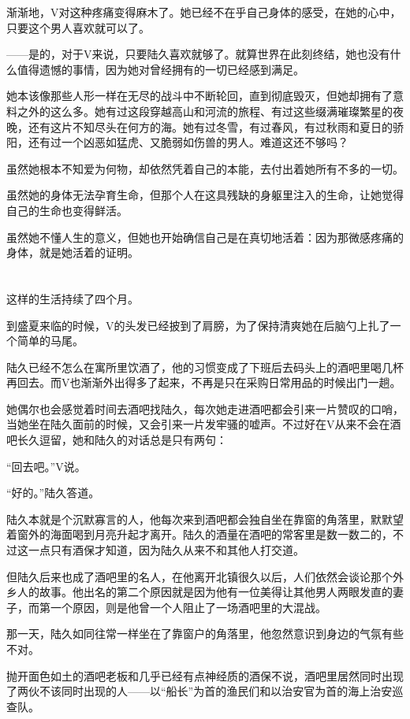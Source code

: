渐渐地，V对这种疼痛变得麻木了。她已经不在乎自己身体的感受，在她的心中，只要这个男人喜欢就可以了。

——是的，对于V来说，只要陆久喜欢就够了。就算世界在此刻终结，她也没有什么值得遗憾的事情，因为她对曾经拥有的一切已经感到满足。

她本该像那些人形一样在无尽的战斗中不断轮回，直到彻底毁灭，但她却拥有了意料之外的这么多。她有过这段穿越高山和河流的旅程、有过这些缀满璀璨繁星的夜晚，还有这片不知尽头在何方的海。她有过冬雪，有过春风，有过秋雨和夏日的骄阳，还有过一个凶恶如猛虎、又脆弱如伤兽的男人。难道这还不够吗？

虽然她根本不知爱为何物，却依然凭着自己的本能，去付出着她所有不多的一切。

虽然她的身体无法孕育生命，但那个人在这具残缺的身躯里注入的生命，让她觉得自己的生命也变得鲜活。

虽然她不懂人生的意义，但她也开始确信自己是在真切地活着：因为那微感疼痛的身体，就是她活着的证明。

\section*{}

这样的生活持续了四个月。

到盛夏来临的时候，V的头发已经披到了肩膀，为了保持清爽她在后脑勺上扎了一个简单的马尾。

陆久已经不怎么在寓所里饮酒了，他的习惯变成了下班后去码头上的酒吧里喝几杯再回去。而V也渐渐外出得多了起来，不再是只在采购日常用品的时候出门一趟。

她偶尔也会感觉着时间去酒吧找陆久，每次她走进酒吧都会引来一片赞叹的口哨，当她坐在陆久面前的时候，又会引来一片发牢骚的嘘声。不过好在V从来不会在酒吧长久逗留，她和陆久的对话总是只有两句：

“回去吧。”V说。

“好的。”陆久答道。

陆久本就是个沉默寡言的人，他每次来到酒吧都会独自坐在靠窗的角落里，默默望着窗外的海面喝到月亮升起才离开。陆久的酒量在酒吧的常客里是数一数二的，不过这一点只有酒保才知道，因为陆久从来不和其他人打交道。

但陆久后来也成了酒吧里的名人，在他离开北镇很久以后，人们依然会谈论那个外乡人的故事。他出名的第二个原因就是因为他有一位美得让其他男人两眼发直的妻子，而第一个原因，则是他曾一个人阻止了一场酒吧里的大混战。

那一天，陆久如同往常一样坐在了靠窗户的角落里，他忽然意识到身边的气氛有些不对。

抛开面色如土的酒吧老板和几乎已经有点神经质的酒保不说，酒吧里居然同时出现了两伙不该同时出现的人——以“船长”为首的渔民们和以治安官为首的海上治安巡查队。


